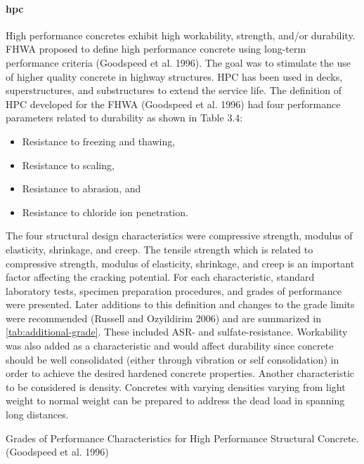 \paragraph{\acrfull*{hpc}}
High performance concretes exhibit high workability, strength, and/or durability. FHWA proposed to define high performance concrete using long-term performance criteria (Goodspeed et al. 1996). The goal was to stimulate the use of higher quality concrete in highway structures. HPC has been used in decks, superstructures, and substructures to extend the service life. The definition of HPC developed for the FHWA (Goodspeed et al. 1996) had four performance parameters related to durability as shown in Table 3.4:

\begin{itemize}
  \item Resistance to freezing and thawing,
  \item Resistance to scaling,
  \item Resistance to abrasion, and
  \item Resistance to chloride ion penetration.
\end{itemize}

The four structural design characteristics were compressive strength, modulus of elasticity, shrinkage, and creep. The tensile strength which is related to compressive strength, modulus of elasticity, shrinkage, and creep is an important factor affecting the cracking potential. For each characteristic, standard laboratory tests, specimen preparation procedures, and grades of performance were presented. Later additions to this definition and changes to the grade limits were recommended (Russell and Ozyildirim 2006) and are summarized in \cref{tab:additional-grade}. These included ASR- and sulfate-resistance. Workability was also added as a characteristic and would affect durability since concrete should be well consolidated (either through vibration or self consolidation) in order to achieve the desired hardened concrete properties. Another characteristic to be considered is density. Concretes with varying densities varying from light weight to normal weight can be prepared to address the dead load in spanning long distances.

\begin{table}
  \caption{Grades of Performance Characteristics for High Performance Structural Concrete. (Goodspeed et al. 1996)}\label{tab:grade-hpc}
\end{table}

